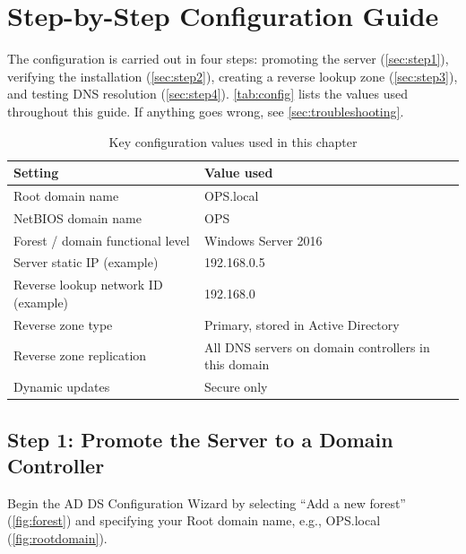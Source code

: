 \section{Step-by-Step Configuration Guide}
\label{sec:guide}
The configuration is carried out in four steps: promoting the server (\autoref{sec:step1}), verifying the installation (\autoref{sec:step2}), creating a reverse lookup zone (\autoref{sec:step3}), and testing DNS resolution (\autoref{sec:step4}). \autoref{tab:config} lists the values used throughout this guide. If anything goes wrong, see \autoref{sec:troubleshooting}.

\begin{table}[H]
  \centering
  \small\sffamily
  \renewcommand{\arraystretch}{1.3}
  \begin{tabular}{@{}p{5.6cm}p{8.6cm}@{}}
    \toprule
    \textbf{Setting} & \textbf{Value used} \\
    \midrule
    Root domain name & OPS.local \\
    NetBIOS domain name & OPS \\
    Forest / domain functional level & Windows Server 2016 \\
    Server static IP (example) & 192.168.0.5 \\
    Reverse lookup network ID (example) & 192.168.0 \\
    Reverse zone type & Primary, stored in Active Directory \\
    Reverse zone replication & All DNS servers on domain controllers in this domain \\
    Dynamic updates & Secure only \\
    \bottomrule
  \end{tabular}
  \caption{Key configuration values used in this chapter}\label{tab:config}
\end{table}

\subsection{Step 1: Promote the Server to a Domain Controller}
\label{sec:step1}
Begin the AD DS Configuration Wizard by selecting ``Add a new forest'' (\autoref{fig:forest}) and specifying your Root domain name, e.g., OPS.local (\autoref{fig:rootdomain}).


